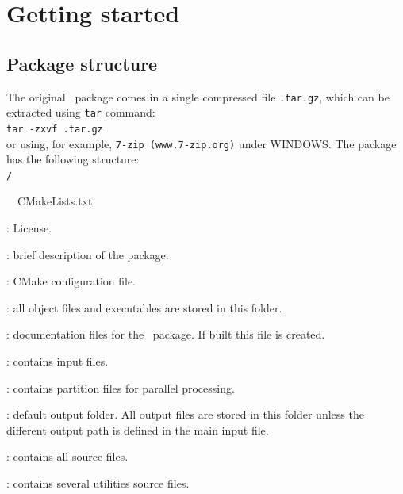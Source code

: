 \chapter{Getting started}
\label{chap:start}
\section{Package structure}
The original \pack\ package comes in a single compressed file \linebreak\texttt{\pack.tar.gz}, which can be extracted using \texttt{tar} command:\\

\texttt{tar -zxvf \pack.tar.gz}\\

or using, for example, \texttt{7-zip (www.7-zip.org)} under WINDOWS. The package has the following structure:\\



\texttt{\pack/}
\begin{adescription}{~~CMakeLists.txt}
\item[~~COPYING]               : License.
\item[~~README]                : brief description of the package.
\item[~~CMakeLists.txt]        : CMake configuration file.
\item[~~bin/]                  : all object files and executables are stored in this folder.
\item[~~doc/]                  : documentation files for the \pack\ package. If built this file is created.
\item[~~input/]                : contains input files.
\item[~~partition/]            : contains partition files for parallel processing.
\item[~~output/]               : default output folder. All output files are stored in this folder unless the different output path is defined in the main input file.
\item[~~src/]                  : contains all source files.
\item[~~util/]                 : contains several utilities source files.
\end{adescription}


